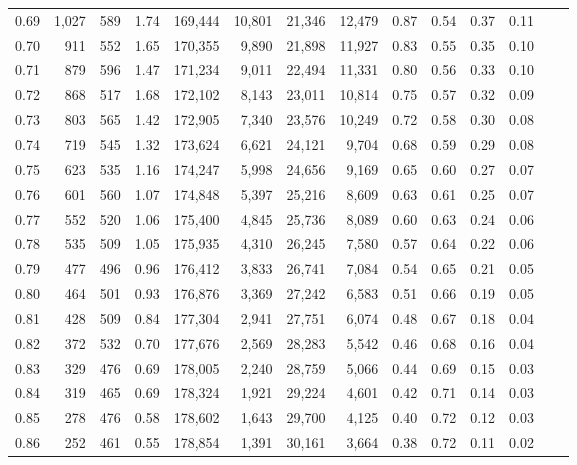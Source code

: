 \begin{tabular}{rrrrrrrrrrrrrr}
0.69 &  1,027 &  589 &    1.74 &  169,444 &   10,801 &  21,346 &  12,479 &  0.87 &  0.54 &  0.37 &      0.11 \\
0.70 &    911 &  552 &    1.65 &  170,355 &    9,890 &  21,898 &  11,927 &  0.83 &  0.55 &  0.35 &      0.10 \\
0.71 &    879 &  596 &    1.47 &  171,234 &    9,011 &  22,494 &  11,331 &  0.80 &  0.56 &  0.33 &      0.10 \\
0.72 &    868 &  517 &    1.68 &  172,102 &    8,143 &  23,011 &  10,814 &  0.75 &  0.57 &  0.32 &      0.09 \\
0.73 &    803 &  565 &    1.42 &  172,905 &    7,340 &  23,576 &  10,249 &  0.72 &  0.58 &  0.30 &      0.08 \\
0.74 &    719 &  545 &    1.32 &  173,624 &    6,621 &  24,121 &   9,704 &  0.68 &  0.59 &  0.29 &      0.08 \\
0.75 &    623 &  535 &    1.16 &  174,247 &    5,998 &  24,656 &   9,169 &  0.65 &  0.60 &  0.27 &      0.07 \\
0.76 &    601 &  560 &    1.07 &  174,848 &    5,397 &  25,216 &   8,609 &  0.63 &  0.61 &  0.25 &      0.07 \\
0.77 &    552 &  520 &    1.06 &  175,400 &    4,845 &  25,736 &   8,089 &  0.60 &  0.63 &  0.24 &      0.06 \\
0.78 &    535 &  509 &    1.05 &  175,935 &    4,310 &  26,245 &   7,580 &  0.57 &  0.64 &  0.22 &      0.06 \\
0.79 &    477 &  496 &    0.96 &  176,412 &    3,833 &  26,741 &   7,084 &  0.54 &  0.65 &  0.21 &      0.05 \\
0.80 &    464 &  501 &    0.93 &  176,876 &    3,369 &  27,242 &   6,583 &  0.51 &  0.66 &  0.19 &      0.05 \\
0.81 &    428 &  509 &    0.84 &  177,304 &    2,941 &  27,751 &   6,074 &  0.48 &  0.67 &  0.18 &      0.04 \\
0.82 &    372 &  532 &    0.70 &  177,676 &    2,569 &  28,283 &   5,542 &  0.46 &  0.68 &  0.16 &      0.04 \\
0.83 &    329 &  476 &    0.69 &  178,005 &    2,240 &  28,759 &   5,066 &  0.44 &  0.69 &  0.15 &      0.03 \\
0.84 &    319 &  465 &    0.69 &  178,324 &    1,921 &  29,224 &   4,601 &  0.42 &  0.71 &  0.14 &      0.03 \\
0.85 &    278 &  476 &    0.58 &  178,602 &    1,643 &  29,700 &   4,125 &  0.40 &  0.72 &  0.12 &      0.03 \\
0.86 &    252 &  461 &    0.55 &  178,854 &    1,391 &  30,161 &   3,664 &  0.38 &  0.72 &  0.11 &      0.02 \\

\end{tabular}

